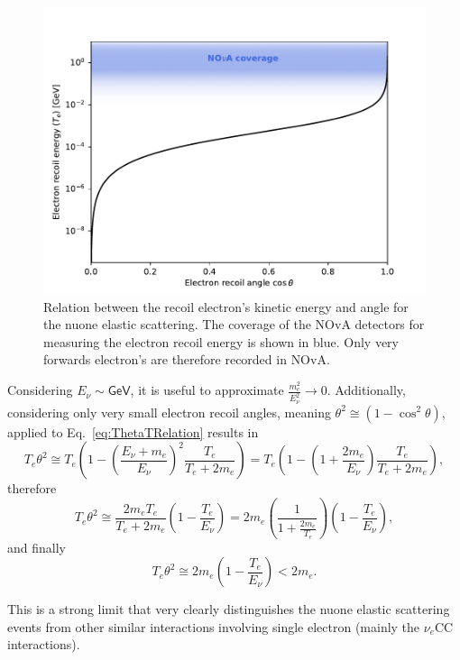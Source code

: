 \begin{figure}[hbtp]
\centering
\includegraphics[width=.7\linewidth]{Plots/NuMM/KinematicsTOnTh.pdf}
\caption[Electron recoil energy versus recoil angle]{Relation between the recoil electron's kinetic energy and angle for the \acrshort{nuone} elastic scattering. The coverage of the \acrshort{NOvA} detectors for measuring the electron recoil energy is shown in blue. Only very forwards electron's are therefore recorded in \acrshort{NOvA}.}
\label{fig:TThetaDistribution}
\end{figure}

Considering $E_{\nu}\sim\textsf{GeV}$, it is useful to approximate $\frac{m_e^2}{E_{\nu}^2}\rightarrow 0$. Additionally, considering only very small electron recoil angles, meaning $\theta^2\cong \left(1-\cos^2\theta\right)$, applied to Eq.~\ref{eq:ThetaTRelation} results in
\begin{equation}
T_e\theta^2\cong T_e\left(1-\left(\frac{E_\nu+m_e}{E_\nu}\right)^2\frac{T_e}{T_e+2m_e}\right)
=T_e\left(1-\left(1+\frac{2m_e}{E_\nu}\right)\frac{T_e}{T_e+2m_e}\right),
\end{equation}
therefore
\begin{equation}
T_e\theta^2\cong \frac{2m_eT_e}{T_e+2m_e}\left(1-\frac{T_e}{E_\nu}\right)=2m_e\left(\frac{1}{1+\frac{2m_e}{T_e}}\right)\left(1-\frac{T_e}{E_\nu}\right),
\end{equation}
and finally
\begin{equation}\label{eqTThetaSqExp}
T_e\theta^2\cong 2m_e\left(1-\frac{T_e}{E_{\nu}}\right)<2m_e.
\end{equation}

This is a strong limit that very clearly distinguishes the \gls{nuone} elastic scattering events from other similar interactions involving single electron (mainly the $\nu_e$\gls{CC} interactions).


